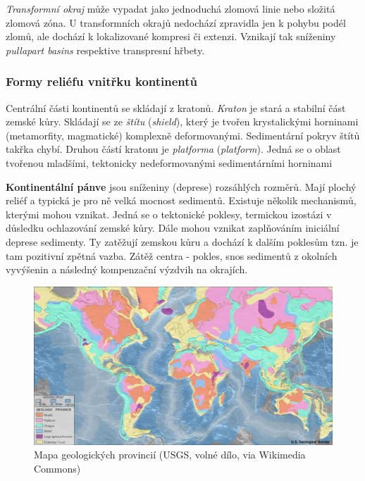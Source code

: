 \emph{Transformní okraj} může vypadat jako jednoduchá zlomová linie nebo složitá zlomová zóna. U transformních okrajů nedochází zpravidla jen k pohybu podél zlomů, ale dochází k lokalizované kompresi či extenzi. Vznikají tak sníženiny \textit{pullapart basins} respektive transpresní hřbety.

\subsubsection{Formy reliéfu vnitřku kontinentů}
Centrální části kontinentů se skládají z kratonů. \emph{Kraton} je stará a stabilní část zemské kůry. Skládají se ze \emph{štítu} (\textit{shield}), který je tvořen krystalickými horninami (metamorfity, magmatické) komplexně deformovanými. Sedimentární pokryv štítů takřka chybí. Druhou částí kratonu je \emph{platforma} (\textit{platform}). Jedná se o oblast tvořenou mladšími, tektonicky nedeformovanými sedimentárními horninami 

\textbf{Kontinentální pánve} jsou sníženiny (deprese) rozsáhlých rozměrů. Mají plochý reliéf a typická je pro ně velká mocnost sedimentů. Existuje několik mechanismů, kterými mohou vznikat. Jedná se o tektonické poklesy, termickou izostázi v důsledku ochlazování zemské kůry. Dále mohou vznikat zaplňováním iniciální deprese sedimenty. Ty zatěžují zemskou kůru a dochází k dalším poklesům tzn. je tam pozitivní zpětná vazba. Zátěž centra - pokles, snos sedimentů z okolních vyvýšenin a následný kompenzační výzdvih na okrajích.

\begin{figure}
	\centering
	\includegraphics[width=1\linewidth]{obrazky/tectonic/World_geologic_provinces}
	\caption{Mapa geologických provincií (USGS, volné dílo, via Wikimedia Commons)}
	\label{fig:worldgeologicprovinces}
\end{figure}


